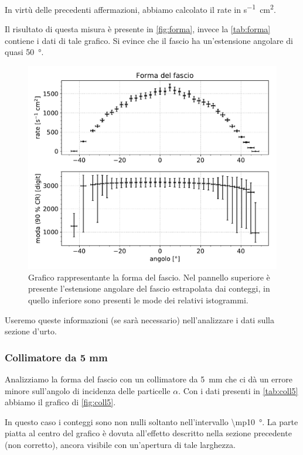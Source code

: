 In virtù delle precedenti affermazioni, abbiamo calcolato il rate in \si{s^{-1}cm^2}.

Il risultato di questa misura è presente in \autoref{fig:forma}, invece la \autoref{tab:forma} contiene i dati di tale grafico.
Si evince che il fascio ha un'estensione angolare di quasi \SI{50}{\degree}. 

\begin{figure}[h]
\centering
\includegraphics[width=30 em]{immagini/forma}
\caption{Grafico rappresentante la forma del fascio. Nel pannello superiore è presente l'estensione angolare del fascio estrapolata dai conteggi, in quello inferiore sono presenti le mode dei relativi istogrammi.}
\label{fig:forma}
\end{figure}

Useremo queste informazioni (se sarà necessario) nell'analizzare i dati sulla sezione d'urto.

\subsubsection{Collimatore da 5\! mm}

Analizziamo la forma del fascio con un collimatore da \SI{5}{mm} che ci dà un errore minore sull'angolo di incidenza delle particelle $\alpha$.
Con i dati presenti in \autoref{tab:coll5} abbiamo il grafico di \autoref{fig:coll5}.

In questo caso i conteggi sono non nulli soltanto nell'intervallo \SI{\mp10}{\degree}. La parte piatta al centro del grafico è dovuta all'effetto descritto nella sezione precedente (non corretto), ancora visibile con un'apertura di tale larghezza.

